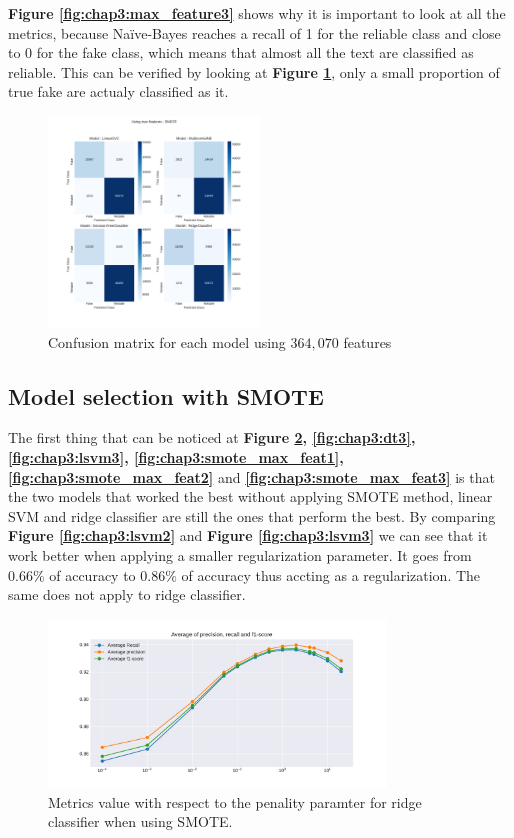 \textbf{Figure \ref{fig:chap3:max_feature3}} shows why it is important to look at all the metrics, because Naïve-Bayes reaches a recall of 1 for the reliable class and close to 0 for the fake class, which means that almost all the text are classified as reliable. This can be verified by looking at \textbf{Figure \ref{fig:chap3:confMat1}}, only a small proportion of true fake are actualy classified as it.

\begin{figure}
	\centering
	\includegraphics[width=0.5\textwidth]{images/chapitre3/confMat_fake_364070}
	\caption{Confusion matrix for each model using $364,070$ features}
	\label{fig:chap3:confMat1}
\end{figure}

\subsection{Model selection with SMOTE}
The first thing that can be noticed at \textbf{Figure \ref{fig:chap3:ridge3}, \ref{fig:chap3:dt3}, \ref{fig:chap3:lsvm3}, \ref{fig:chap3:smote_max_feat1}, \ref{fig:chap3:smote_max_feat2}} and \textbf{\ref{fig:chap3:smote_max_feat3}} is that the two models that worked the best without applying SMOTE method, linear SVM and ridge classifier are still the ones that perform the best. By comparing \textbf{Figure \ref{fig:chap3:lsvm2}} and \textbf{Figure \ref{fig:chap3:lsvm3}} we can see that it work better when applying a smaller regularization parameter. It goes from $0.66\%$ of accuracy to  $0.86\%$ of accuracy thus accting as a regularization. The same does not apply to ridge classifier. \\
\begin{figure}
	\centering
	\includegraphics[width=0.8\textwidth]{images/chapitre3/ridge+smote}
	\caption{Metrics value with respect to the penality paramter for ridge classifier when using SMOTE.}
	\label{fig:chap3:ridge3}
\end{figure}

